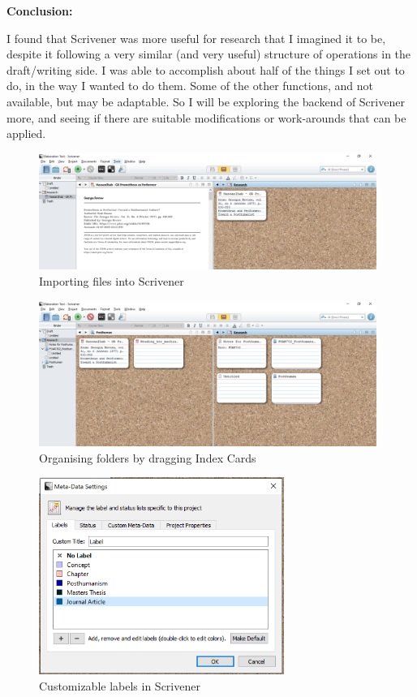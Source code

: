 \documentclass{article}
\begin{document}
\textbf{Conclusion:}

I found that Scrivener was more useful for research that I imagined it to be, despite it following a very similar (and very useful) structure of operations in the draft/writing side. 
I was able to accomplish about half of the things I set out to do, in the way I wanted to do them. Some of the other functions, and not available, but may be adaptable. So I will be exploring the backend of Scrivener more, and seeing if there are suitable modifications or work-arounds that can be applied.

\begin{figure}[htbp]
    \centering
    \includegraphics[width=11cm]{Images/ScrivenerTest001.PNG}
    \caption{Importing files into Scrivener}
    \label{fig:Scivener Research Screen}
\end{figure}

\begin{figure}[htbp]
    \centering
    \includegraphics[width=11cm]{Images/ScrivenerTest002.PNG}
    \caption{Organising folders by dragging Index Cards}
    \label{fig:Scrivener Folder Organisation}
\end{figure}

\begin{figure}[htbp]
    \centering
    \includegraphics[width=8cm]{Images/ScrivenerTest003.PNG}
    \caption{Customizable labels in Scrivener}
    \label{fig:Scrivener Labels}
\end{figure}
\end{document}
